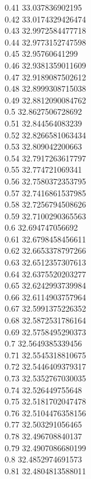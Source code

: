 {0.41	33.037836902195\\
0.42	33.0174329426474\\
0.43	32.9972584477718\\
0.44	32.9773152747598\\
0.45	32.95760641299\\
0.46	32.9381359011609\\
0.47	32.9189087502612\\
0.48	32.8999308715038\\
0.49	32.8812090084762\\
0.5	32.8627506728692\\
0.51	32.844564083239\\
0.52	32.8266581063434\\
0.53	32.809042200663\\
0.54	32.7917263617797\\
0.55	32.774721069341\\
0.56	32.7580372353795\\
0.57	32.7416861537985\\
0.58	32.7256794508626\\
0.59	32.7100290365563\\
0.6	32.694747056692\\
0.61	32.6798458456611\\
0.62	32.6653378797266\\
0.63	32.6512357307613\\
0.64	32.6375520203277\\
0.65	32.6242993739984\\
0.66	32.6114903757964\\
0.67	32.5991375226352\\
0.68	32.5872531786164\\
0.69	32.5758495290373\\
0.7	32.5649385339456\\
0.71	32.5545318810675\\
0.72	32.5446409379317\\
0.73	32.5352767030035\\
0.74	32.526449755648\\
0.75	32.5181702047478\\
0.76	32.5104476358156\\
0.77	32.503291056465\\
0.78	32.496708840137\\
0.79	32.4907086680199\\
0.8	32.4852974691573\\
0.81	32.4804813588011\\
}
